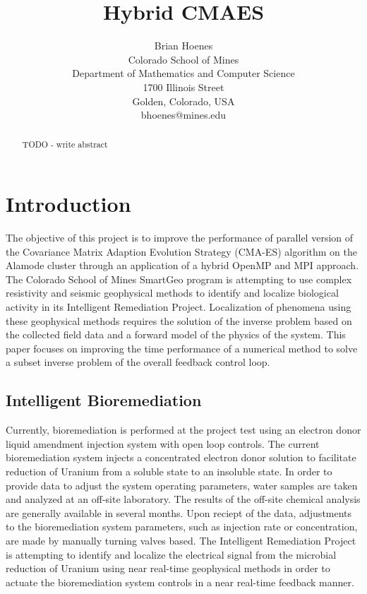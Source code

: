 \documentclass[twocolumn, balance]{article}
\begin{document}
\title{Hybrid CMAES}

\author{Brian Hoenes\\
    Colorado School of Mines\\
	Department of Mathematics and Computer Science\\
	1700 Illinois Street\\
    Golden, Colorado, USA\\
	bhoenes@mines.edu}

\maketitle
\begin{abstract}
TODO - write abstract
\end{abstract}

\clearpage

\section{Introduction}
The objective of this project is to improve the performance of parallel version of the Covariance Matrix Adaption Evolution Strategy (CMA-ES) algorithm on the Alamode cluster through an application of a hybrid OpenMP and MPI approach.  The Colorado School of Mines SmartGeo program is attempting to use complex resistivity and seismic geophysical methods to identify and localize biological activity in its Intelligent Remediation Project.  Localization of phenomena using these geophysical methods requires the solution of the inverse problem based on the collected field data and a forward model of the physics of the system.  This paper focuses on improving the time performance of a numerical method to solve a subset inverse problem of the overall feedback control loop.

\subsection{Intelligent Bioremediation}
Currently, bioremediation is performed at the project test using an electron donor liquid amendment injection system with open loop controls.  The current bioremediation system injects a concentrated electron donor solution to facilitate reduction of Uranium from a soluble state to an insoluble state.  In order to provide data to adjust the system operating parameters, water samples are taken and analyzed at an off-site laboratory.  The results of the off-site chemical analysis are generally available in several months.  Upon reciept of the data, adjustments to the bioremediation system parameters, such as injection rate or concentration, are made by manually turning valves based.  The Intelligent Remediation Project is attempting to identify and localize the electrical signal from the microbial reduction of Uranium using near real-time geophysical methods in order to actuate the bioremediation system controls in a near real-time feedback manner.
\end{document}
